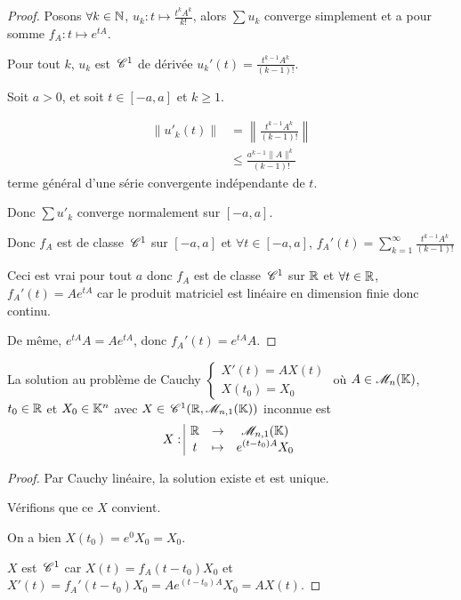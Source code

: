 \begin{proof}
    Posons $\forall k \in \mathbb{N}$, $u_k: t \mapsto \frac{t^k A^k}{k!}$, alors 
    $\sum u_k$ converge simplement et a pour somme $f_A : t \mapsto e^{tA}$.

    Pour tout $k$, $u_k$ est $\,\mathscr C^{1}$ de dérivée $u_k'(t) = \frac{t^{k - 1} A^k}{(k - 1)!}$.

    Soit $a > 0$, et soit $t \in [-a, a]$ et $k \geqslant 1$. 

    \begin{align}
        \| u'_k(t) \| & = \left\| \frac{t^{k - 1} A^k}{(k - 1)!} \right\| \\
        & \leqslant \frac{a^{k - 1} \| A \|^k}{(k - 1)!}
    \end{align}
    terme général d'une série convergente indépendante de $t$. 

    Donc $\sum u'_k$ converge normalement sur $[-a, a]$.

    Donc $f_A$ est de classe $\,\mathscr C^{1}$ sur $[-a, a]$ et $\forall t \in [-a, a]$, $f_A'(t) = \sum_{k = 1}^\infty \frac{t^{k - 1} A^k}{(k - 1)!}$

    Ceci est vrai pour tout $a$ donc $f_A$ est de classe $\,\mathscr C^{1}$ sur $\mathbb{R}$ et $\forall t \in \mathbb{R}$, 
    $f_A'(t) = A e^{tA}$ car le produit matriciel est linéaire en dimension finie donc continu. 

    De même, $e^{tA} A = A e^{tA}$, donc $f_A'(t) = e^{tA} A$.
\end{proof}

\begin{theoreme}{}{}
    La solution au problème de Cauchy $\begin{cases}
    X'(t) = A X(t) \\
    X(t_0) = X_0
    \end{cases}$ où $A \in \mathscr M_n(\mathbb{K})$, $t_0 \in \mathbb{R}$ et $X_0 \in \mathbb{K}^n$ avec $X \in \,\mathscr C^{1} (\mathbb{R}, \mathscr M_{n, 1}(\mathbb{K}))$ inconnue
    est $$X: \space \begin{array}{|ccc} \displaystyle \mathbb{R} & \to & \displaystyle \mathscr M_{n, 1}(\mathbb{K}) \\ \displaystyle t & \mapsto & \displaystyle e^{(t - t_0) A} X_0 \end{array}$$
\end{theoreme}

\begin{proof}
    Par Cauchy linéaire, la solution existe et est unique. 

    Vérifions que ce $X$ convient. 

    On a bien $X(t_0) = e^0 X_0 = X_0$.

    $X$ est $\,\mathscr C^{1}$ car $X(t) = f_A(t - t_0) X_0$ et $X'(t) = f_A'(t - t_0) X_0 = A e^{(t - t_0) A} X_0 = A X(t)$.
\end{proof}

